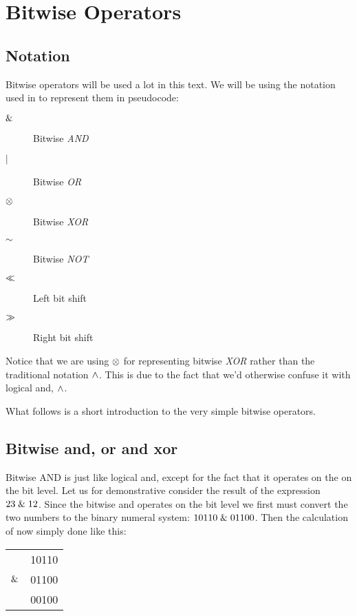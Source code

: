 \section{Bitwise Operators}
\label{sec:bitwise-operators}

\subsection{Notation}

Bitwise operators will be used a lot in this text. We will be using
the notation used in \C{}\cite{kernighan1988c} to represent them in pseudocode:

\begin{description}
\item[$\mathrel{\&}$] Bitwise \textit{AND}
\item[$\mathrel{|}$] Bitwise \textit{OR}
\item[$\mathrel{\otimes}$] Bitwise \textit{XOR}
\item[$\mathord{\sim}$] Bitwise \textit{NOT}
\item[$\ll$] Left bit shift
\item[$\gg$] Right bit shift
\end{description}

Notice that we are using $\mathrel{\otimes}$ for representing bitwise
\textit{XOR} rather than the traditional \C notation $\wedge$. This is due to
the fact that we'd otherwise confuse it with logical and, $\wedge$.

What follows is a short introduction to the very simple bitwise
operators.

\subsection{Bitwise and, or and xor}

Bitwise AND is just like logical and, except for the fact that it
operates on the on the bit level. Let us for demonstrative consider
the result of the expression $23 \mathrel{\&} 12$. Since the bitwise and
operates on the bit level we first must convert the two numbers to the
binary numeral system: $10110 \mathrel{\&} 01100$. Then the calculation of
now simply done like this:

\begin{center}
  \begin{tabular}{lr}
    & 10110  \\
    $\mathrel{\&}$ & 01100 \\
    \hline
    & 00100 \\
  \end{tabular}
\end{center}

